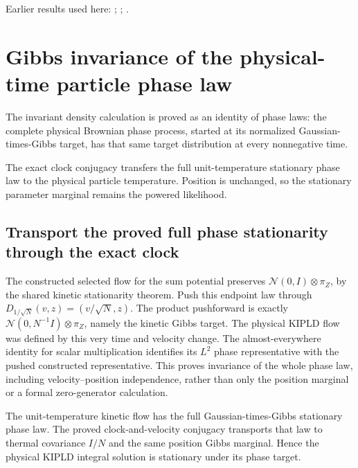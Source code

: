 \documentclass[11pt,a4paper]{report}
\begin{document}
Earlier results used here: \cite[Section~3.20.3]{LangevinLean2026ULASC}; \cite[Section~3.1.1]{LangevinLean2026IPLA}; \cite[Section~3.112.3]{LangevinLean2026Kinetic}.
\section{\texorpdfstring{Gibbs invariance of the physical-time particle phase law}{Gibbs invariance of the physical-time particle phase law}}
\label{proof-module-KIPLMC-Stationarity-lean}


The invariant density calculation is proved as an identity of phase laws: the complete physical Brownian phase process, started at its normalized Gaussian-times-Gibbs target, has that same target distribution at every nonnegative time.



The exact clock conjugacy transfers the full unit-temperature stationary phase law to the physical particle temperature. Position is unchanged, so the stationary parameter marginal remains the powered likelihood.

\subsection{\texorpdfstring{Transport the proved full phase stationarity through the exact clock}{Transport the proved full phase stationarity through the exact clock}}
\label{report-step-KIPLMC-Stationarity-lean-1}


The constructed selected flow for the sum potential preserves \(\mathcal N(0,I)\otimes\pi_Z\), by the shared kinetic stationarity theorem. Push this endpoint law through \(D_{1/\sqrt N}(v,z)=(v/\sqrt N,z)\). The product pushforward is exactly \(\mathcal N(0,N^{-1}I)\otimes\pi_Z\), namely the kinetic Gibbs target. The physical KIPLD flow was defined by this very time and velocity change. The almost-everywhere identity for scalar multiplication identifies its \(L^{2}\) phase representative with the pushed constructed representative. This proves invariance of the whole phase law, including velocity–position independence, rather than only the position marginal or a formal zero-generator calculation.



The unit-temperature kinetic flow has the full Gaussian-times-Gibbs stationary phase law. The proved clock-and-velocity conjugacy transports that law to thermal covariance \(I/N\) and the same position Gibbs marginal. Hence the physical KIPLD integral solution is stationary under its phase target.
\end{document}
